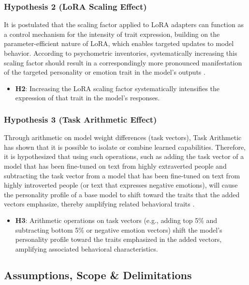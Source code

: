 \documentclass{DESSThesis}
\begin{document}
\subsubsection{Hypothesis 2 (LoRA Scaling Effect)}
It is postulated that the scaling factor applied to LoRA adapters can function as a control mechanism for the intensity of trait expression, building on the parameter-efficient nature of LoRA, which enables targeted updates to model behavior. According to psychometric inventories, systematically increasing this scaling factor should result in a correspondingly more pronounced manifestation of the targeted personality or emotion trait in the model's outputs \cite{hu_lora_2021,lialin_scaling_2023,zhao_lora_2024}.
\begin{itemize}
\item \textbf{H2}: Increasing the LoRA scaling factor systematically intensifies the expression of that trait in the model’s responses.
\end{itemize}

\subsubsection{Hypothesis 3 (Task Arithmetic Effect)}
Through arithmetic on model weight differences (task vectors), Task Arithmetic has shown that it is possible to isolate or combine learned capabilities. Therefore, it is hypothesized that using such operations, such as adding the task vector of a model that has been fine-tuned on text from highly extraverted people and subtracting the task vector from a model that has been fine-tuned on text from highly introverted people (or text that expresses negative emotions), will cause the personality profile of a base model to shift toward the traits that the added vectors emphasize, thereby amplifying related behavioral traits \cite{ilharco_editing_2023,chronopoulou_language_2023}.
\begin{itemize}
    \item \textbf{H3}: Arithmetic operations on task vectors (e.g., adding top 5\% and subtracting bottom 5\% or negative emotion vectors) shift the model’s personality profile toward the traits emphasized in the added vectors, amplifying associated behavioral characteristics.
\end{itemize}

\subsection{Assumptions, Scope \& Delimitations}
\end{document}
